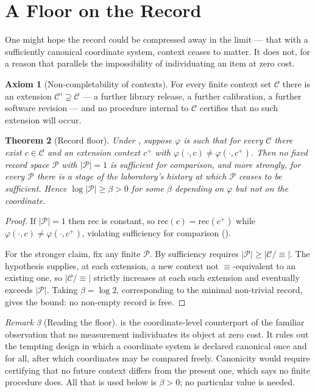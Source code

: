 \documentclass[11pt,a4paper]{article}
\newtheorem{theorem}{Theorem}[section]
\theoremstyle{definition}
\newtheorem{axiom}[theorem]{Axiom}
\theoremstyle{remark}
\newtheorem{remark}[theorem]{Remark}
\newcommand{\Ctx}{\mathcal{C}}               %
\newcommand{\Prv}{\mathcal{P}}               %
\newcommand{\rec}{\mathrm{rec}}
\newcommand{\flo}{\beta}
\begin{document}
\section{A Floor on the Record}
\label{sec:floor}

One might hope the record could be compressed away in the limit --- that
with a sufficiently canonical coordinate system, context ceases to
matter. It does not, for a reason that parallels the impossibility of
individuating an item at zero cost.

\begin{axiom}[Non-completability of contexts]\label{ax:noncomplete}
For every finite context set $\Ctx$ there is an extension
$\Ctx' \supsetneq \Ctx$ --- a further library release, a further
calibration, a further software revision --- and no procedure internal to
$\Ctx$ certifies that no such extension will occur.
\end{axiom}

\begin{theorem}[Record floor]\label{thm:record-floor}
Under , suppose $\varphi$ is such that for every
$\Ctx$ there exist $c \in \Ctx$ and an extension context $c^{+}$ with
$\varphi(\cdot,c) \neq \varphi(\cdot,c^{+})$. Then no fixed record space
$\Prv$ with $|\Prv| = 1$ is sufficient for comparison, and more strongly,
for every $\Prv$ there is a stage of the laboratory's history at which
$\Prv$ ceases to be sufficient. Hence $\log|\Prv| \geq \flo > 0$ for some
$\flo$ depending on $\varphi$ but not on the coordinate.
\end{theorem}

\begin{proof}
If $|\Prv| = 1$ then $\rec$ is constant, so $\rec(c) = \rec(c^{+})$ while
$\varphi(\cdot,c) \neq \varphi(\cdot,c^{+})$, violating sufficiency for
comparison ().

For the stronger claim, fix any finite $\Prv$. By
 sufficiency requires
$|\Prv| \geq |\Ctx/\!\equiv|$. The hypothesis supplies, at each
extension, a new context not $\equiv$-equivalent to an existing one, so
$|\Ctx/\!\equiv|$ strictly increases at each such extension and
eventually exceeds $|\Prv|$. Taking $\flo = \log 2$, corresponding to the
minimal non-trivial record, gives the bound: no non-empty record is free.
\end{proof}

\begin{remark}[Reading the floor]\label{rem:floor}
 is the coordinate-level counterpart of the
familiar observation that no measurement individuates its object at zero
cost. It rules out the tempting design in which a coordinate system is
declared canonical once and for all, after which coordinates may be
compared freely. Canonicity would require certifying that no future
context differs from the present one, which  says no
finite procedure does. All that is used below is $\flo > 0$; no
particular value is needed.
\end{remark}
\end{document}
